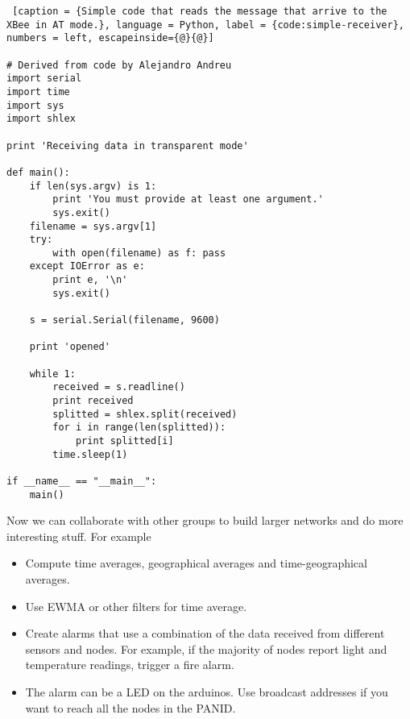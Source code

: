\begin{lstlisting} [caption = {Simple code that reads the message that arrive to the XBee in AT mode.}, language = Python, label = {code:simple-receiver}, numbers = left, escapeinside={@}{@}]

# Derived from code by Alejandro Andreu
import serial
import time
import sys
import shlex

print 'Receiving data in transparent mode'

def main():
    if len(sys.argv) is 1:
        print 'You must provide at least one argument.'
        sys.exit()
    filename = sys.argv[1]
    try:
        with open(filename) as f: pass
    except IOError as e:
        print e, '\n'
        sys.exit()

    s = serial.Serial(filename, 9600)

    print 'opened'

    while 1:
        received = s.readline()
        print received
        splitted = shlex.split(received)
        for i in range(len(splitted)):
            print splitted[i]
        time.sleep(1)

if __name__ == "__main__":
    main()
\end{lstlisting}

Now we can collaborate with other groups to build larger networks and do more interesting stuff.
For example
\begin{itemize}
\item Compute time averages, geographical averages and time-geographical averages.
\item Use EWMA or other filters for time average.
\item Create alarms that use a combination of the data received from different sensors and nodes. 
For example, if the majority of nodes report light and temperature readings, trigger a fire alarm.
\item The alarm can be a LED on the arduinos.
Use broadcast addresses if you want to reach all the nodes in the PANID.
\end{itemize}
